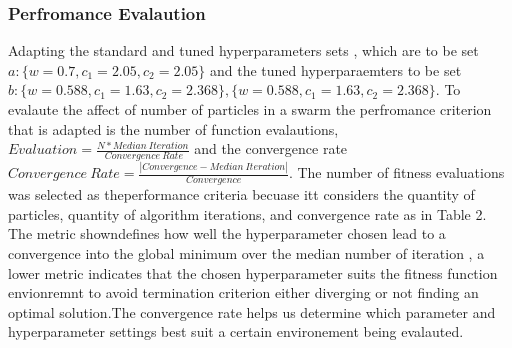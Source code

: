 \documentclass[
]{article}
\begin{document}
\hypertarget{perfromance-evalaution}{%
\subsubsection{Perfromance Evalaution}\label{perfromance-evalaution}}

Adapting the standard and tuned hyperparameters sets , which are to be
set \(a:\{w=0.7,c_1=2.05,c_2=2.05\}\) and the tuned hyperparaemters to
be set
\(b:\{w=0.588,c_1=1.63,c_2=2.368\},\{w=0.588,c_1=1.63,c_2=2.368\}\). To
evalaute the affect of number of particles in a swarm the perfromance
criterion that is adapted is the number of function evalautions,
\(Evaluation=\frac{N * Median\: Iteration }{\: Convergence \:Rate }\)
and the convergence rate
\(Convergence \: Rate=\frac{|Convergence - Median \: Iteration|}{Convergence }\).
The number of fitness evaluations was selected as theperformance
criteria becuase itt considers the quantity of particles, quantity of
algorithm iterations, and convergence rate as in Table 2. The metric
showndefines how well the hyperparameter chosen lead to a convergence
into the global minimum over the median number of iteration , a lower
metric indicates that the chosen hyperparameter suits the fitness
function envionremnt to avoid termination criterion either diverging or
not finding an optimal solution.The convergence rate helps us determine
which parameter and hyperparameter settings best suit a certain
environement being evalauted.
\end{document}
